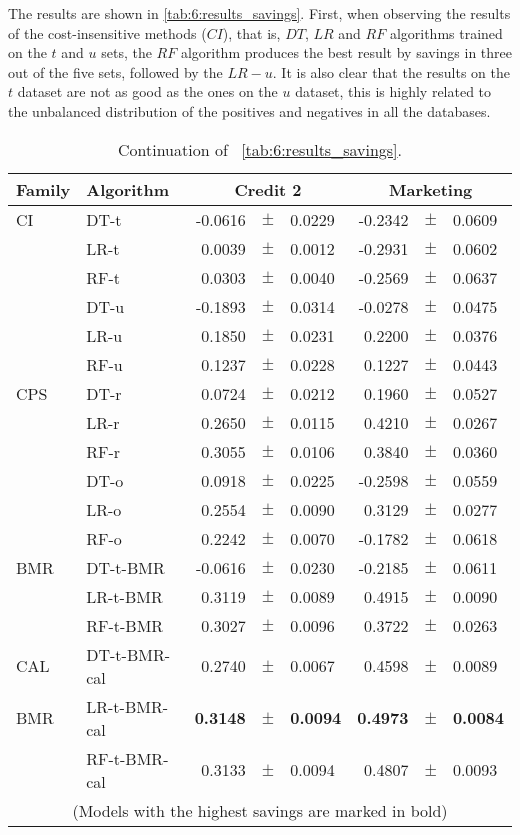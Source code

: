 The results are shown in \tablename{ \ref{tab:6:results_savings}}. First, when observing  the 
results of the cost-insensitive methods ($CI$), that is, $DT$, $LR$ and $RF$ algorithms trained 
on the $t$ and $u$ sets, the $RF$ algorithm produces the best result by savings in three out of 
the five sets, followed by the $LR-u$. It is also clear that the results on the $t$ dataset are 
not as good as the ones on the $u$ dataset, this is highly related to the unbalanced distribution 
of the positives and negatives in all the databases.  
  
\begin{table}[!t]
    \centering
    \footnotesize
    \begin{tabular}{l l r@{\hskip 0in}c@{\hskip 0in}l r@{\hskip 0in}c@{\hskip 0in}l  } %
    \hline
    \bf{Family} & \bf{Algorithm} &  \multicolumn{3}{c}{\bf{Credit 2}} 
& \multicolumn{3}{c}{\bf{Marketing}} \\ 
    \hline
CI&DT-t & -0.0616 &$\pm$& 0.0229 & -0.2342 &$\pm$& 0.0609\\ 
&LR-t & 0.0039 &$\pm$& 0.0012 & -0.2931 &$\pm$& 0.0602\\ 
&RF-t & 0.0303 &$\pm$& 0.0040 & -0.2569 &$\pm$& 0.0637\\ 
&DT-u & -0.1893 &$\pm$& 0.0314 & -0.0278 &$\pm$& 0.0475\\ 
&LR-u & 0.1850 &$\pm$& 0.0231 & 0.2200 &$\pm$& 0.0376\\ 
&RF-u & 0.1237 &$\pm$& 0.0228 & 0.1227 &$\pm$& 0.0443\\ 
\hline 
CPS&DT-r & 0.0724 &$\pm$& 0.0212 & 0.1960 &$\pm$& 0.0527\\ 
&LR-r & 0.2650 &$\pm$& 0.0115 & 0.4210 &$\pm$& 0.0267\\ 
&RF-r & 0.3055 &$\pm$& 0.0106 & 0.3840 &$\pm$& 0.0360\\ 
&DT-o & 0.0918 &$\pm$& 0.0225 & -0.2598 &$\pm$& 0.0559\\ 
&LR-o & 0.2554 &$\pm$& 0.0090 & 0.3129 &$\pm$& 0.0277\\ 
&RF-o & 0.2242 &$\pm$& 0.0070 & -0.1782 &$\pm$& 0.0618\\ 
\hline 
BMR&DT-t-BMR & -0.0616 &$\pm$& 0.0230 & -0.2185 &$\pm$& 0.0611\\ 
&LR-t-BMR & 0.3119 &$\pm$& 0.0089 & 0.4915 &$\pm$& 0.0090\\ 
&RF-t-BMR & 0.3027 &$\pm$& 0.0096 & 0.3722 &$\pm$& 0.0263\\ 
\hline 
CAL&DT-t-BMR-cal & 0.2740 &$\pm$& 0.0067 & 0.4598 &$\pm$& 0.0089\\ 
BMR&LR-t-BMR-cal & \bf{0.3148} &\bf{$\pm$}& \bf{0.0094} & \bf{0.4973} &\bf{$\pm$}& \bf{0.0084}\\ 
&RF-t-BMR-cal & 0.3133 &$\pm$& 0.0094 & 0.4807 &$\pm$& 0.0093\\ 

\hline 
  \multicolumn{8}{c}{(Models with the highest savings are marked in bold)}
  \end{tabular}
    \caption{Continuation of \tablename{~\ref{tab:6:results_savings}}.}
    \label{tab:6:results_savings2}
  \end{table}
  
